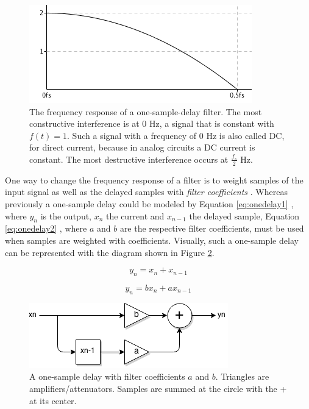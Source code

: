 \documentclass[12pt,twoside]{report}
\begin{document}
\begin{figure}
  \includegraphics[scale=0.8]{img/freqresp}
  \caption{The frequency response of a one-sample-delay filter. The most constructive interference is at 0 Hz, a signal that is constant with $f(t) = 1$. Such a signal with a frequency of 0 Hz is also called DC, for direct current, because in analog circuits a DC current is constant. The most destructive interference occurs at $\frac{f_{s}}{2}$ Hz.}
  \label{fig:freqresp}
\end{figure}

\noindent One way to change the frequency response of a filter is to weight samples of the input signal as well as the delayed samples with \emph{filter coefficients} . Whereas previously a one-sample delay could be modeled by Equation \ref{eq:onedelay1} , where $y_{n}$ is the output, $x_{n}$ the current and $x_{n-1}$ the delayed sample, Equation \ref{eq:onedelay2} , where $a$ and $b$ are the respective filter coefficients, must be used when samples are weighted with coefficients. Visually, such a one-sample delay can be represented with the diagram shown in Figure \ref{fig:onedelay}.

\begin{equation}
  y_{n} = x_{n} + x_{n-1}
  \label{eq:onedelay1}
\end{equation}

\begin{equation}
  y_{n} = bx_{n} + ax_{n-1}
  \label{eq:onedelay2}
\end{equation}

\begin{figure}[h!]
  \includegraphics[scale=0.8]{img/onedelay}
  \caption{A one-sample delay with filter coefficients $a$ and $b$. Triangles are amplifiers/attenuators. Samples are summed at the circle with the + at its center.}
  \label{fig:onedelay}
\end{figure}
\end{document}
